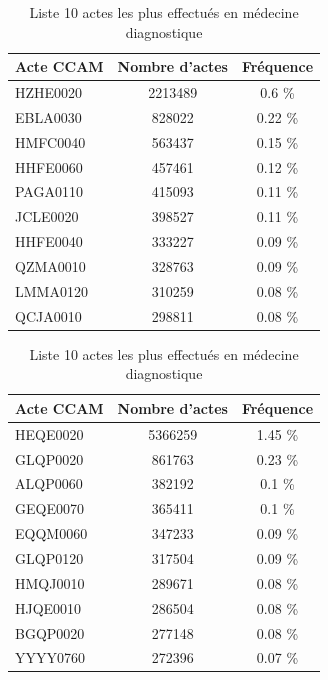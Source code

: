 \begin{table}[!ht]
    \centering
    \begin{minipage}[t]{0.45 \linewidth}
  
\caption{Liste 10 actes les plus effectués en chirurgie} 
\label{actes_chiru}
\begin{tabular}{lcc}
  \hline
Acte CCAM & Nombre d'actes & Fréquence \\ 
  \hline
HZHE0020 & 2213489 & 0.6 \% \\ 
  EBLA0030 & 828022 & 0.22 \% \\ 
  HMFC0040 & 563437 & 0.15 \% \\ 
  HHFE0060 & 457461 & 0.12 \% \\ 
  PAGA0110 & 415093 & 0.11 \% \\ 
  JCLE0020 & 398527 & 0.11 \% \\ 
  HHFE0040 & 333227 & 0.09 \% \\ 
  QZMA0010 & 328763 & 0.09 \% \\ 
  LMMA0120 & 310259 & 0.08 \% \\ 
  QCJA0010 & 298811 & 0.08 \% \\ 
   \hline
\end{tabular}

\end{minipage}
\hfill
\begin{minipage}[t]{0.48 \linewidth}

\centering
\caption{Liste 10 actes les plus effectués en médecine diagnostique} 
\label{actes_diag}
\begin{tabular}{lcc}
  \hline
Acte CCAM & Nombre d'actes & Fréquence \\ 
  \hline
HEQE0020 & 5366259 & 1.45 \% \\ 
  GLQP0020 & 861763 & 0.23 \% \\ 
  ALQP0060 & 382192 & 0.1 \% \\ 
  GEQE0070 & 365411 & 0.1 \% \\ 
  EQQM0060 & 347233 & 0.09 \% \\ 
  GLQP0120 & 317504 & 0.09 \% \\ 
  HMQJ0010 & 289671 & 0.08 \% \\ 
  HJQE0010 & 286504 & 0.08 \% \\ 
  BGQP0020 & 277148 & 0.08 \% \\ 
  YYYY0760 & 272396 & 0.07 \% \\ 
   \hline
\end{tabular}
        
    \end{minipage}
\end{table}

